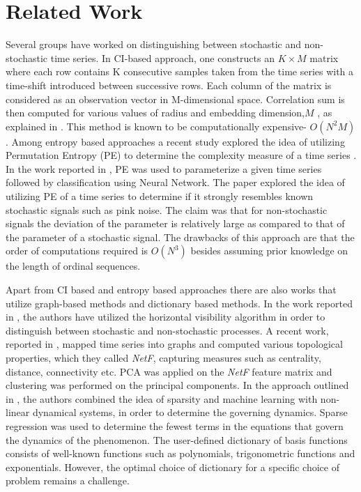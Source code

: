 \documentclass[journal]{IEEEtran}
\begin{document}
	
	\section{Related Work}
	Several groups have worked on distinguishing between stochastic and non-stochastic time series. In CI-based approach, one constructs an $K \times M$ matrix where each row contains K  consecutive samples taken from the time series with a time-shift introduced between successive rows. Each column of the matrix is considered as an observation vector in M-dimensional space. Correlation sum is then computed for various values of radius and embedding dimension,$M$ , as explained in \cite{ci}. This method is known to be computationally expensive- $O(N^2M)$. Among entropy based approaches a recent study explored the idea of utilizing Permutation Entropy (PE) to determine the complexity measure of a time series \cite{Bandt2002}. In the work reported in \cite{Boaretto2021}, PE was used to parameterize a given time series  followed by classification using  Neural Network. The paper explored the idea of utilizing PE of a time series to determine if it strongly resembles known stochastic signals such as pink noise.   The claim was that for non-stochastic signals the deviation of the parameter is relatively large as compared to that of the parameter of a stochastic signal. The drawbacks of this approach are that the order of computations required  is $O(N^3)$ besides assuming prior knowledge on the length of ordinal sequences.

	Apart from CI based and entropy based approaches there are also works that utilize graph-based methods and dictionary based methods. In the work reported in \cite{lacasa2010}, the authors have utilized the horizontal visibility algorithm in order to distinguish between stochastic and non-stochastic processes. A recent work, reported in \cite{Silva2022}, mapped time series into  graphs and computed various topological properties, which they called \textit{NetF}, capturing  measures such as centrality, distance, connectivity etc. PCA was applied on the \textit{NetF} feature matrix and clustering was performed on the principal components. In the approach outlined in \cite{Brunton2016}, the authors combined the idea of sparsity and machine learning with non-linear dynamical systems, in order to determine the governing dynamics. Sparse regression was used to determine the fewest terms in the equations that govern the dynamics of the phenomenon. The user-defined dictionary of basis functions consists of well-known functions such as polynomials, trigonometric functions and exponentials. However, the optimal choice of dictionary for a specific choice of problem remains a challenge.
	
\end{document}
